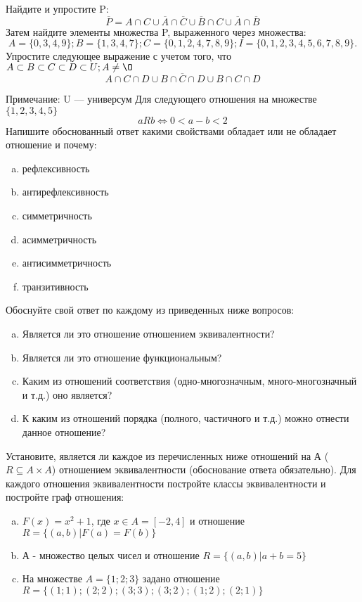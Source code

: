 \documentclass[10pt]{exam}
\begin{document}
\begin{questions}
\question
Найдите и упростите P:
\begin{equation*}
\overline{P} = A \cap C \cup \overline{A} \cap \overline{C} \cup \overline{B} \cap C \cup \overline{A} \cap \overline{B}
\end{equation*}
Затем найдите элементы множества P, выраженного через множества:
\begin{equation*}
A = \{0, 3, 4, 9\}; 
B = \{1, 3, 4, 7\};
C = \{0, 1, 2, 4, 7, 8, 9\};
I = \{0, 1, 2, 3, 4, 5, 6, 7, 8, 9\}.
\end{equation*}\question
Упростите следующее выражение с учетом того, что $A\subset B \subset C \subset D \subset U; A \neq \O$
\begin{equation*}
A \cap C  \cap D \cup B \cap \overline{C} \cap D \cup B \cap C \cap D
\end{equation*}

Примечание: U — универсум\question
Для следующего отношения на множестве $\{1, 2, 3, 4, 5\}$ 
\begin{equation*}
aRb \iff 0 < a-b<2
\end{equation*}
Напишите обоснованный ответ какими свойствами обладает или не обладает отношение и почему:   
\begin{enumerate} [a)]\setcounter{enumi}{0}
\item рефлексивность
\item антирефлексивность
\item симметричность
\item асимметричность
\item антисимметричность
\item транзитивность
\end{enumerate}

Обоснуйте свой ответ по каждому из приведенных ниже вопросов:
\begin{enumerate} [a)]\setcounter{enumi}{0}
    \item Является ли это отношение отношением эквивалентности?
    \item Является ли это отношение функциональным?
    \item Каким из отношений соответствия (одно-многозначным, много-многозначный и т.д.) оно является?
    \item К каким из отношений порядка (полного, частичного и т.д.) можно отнести данное отношение?
\end{enumerate}
\question
Установите, является ли каждое из перечисленных ниже отношений на А ($R \subseteq A \times A$) отношением эквивалентности (обоснование ответа обязательно). Для каждого отношения эквивалентности постройте классы эквивалентности и постройте граф отношения:
\begin{enumerate} [a)]\setcounter{enumi}{0}
\item $F(x)=x^{2}+1$, где $x \in A = [-2, 4]$ и отношение $R = \{(a,b)|F(a) = F(b)\}$
\item А - множество целых чисел и отношение $R = \{(a,b)|a + b = 5\}$
\item На множестве $A = \{1; 2; 3\}$ задано отношение $R = \{(1; 1); (2; 2); (3; 3); (3; 2); (1; 2); (2; 1)\}$


\end{enumerate}
\end{questions}
\end{document}
